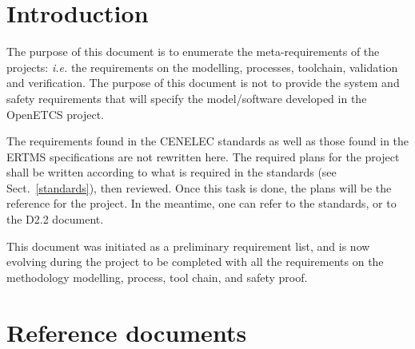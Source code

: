 \documentclass{template/openetcs_article}
\begin{document}
\newenvironment{comment}{
	\begin{quote}
	\begin{itshape}Comment. 
}{
	\end{itshape}
	\end{quote}
}

\newenvironment{justif}{
	\begin{quote}
	\begin{itshape}Justification. 
}{
	\end{itshape}
	\end{quote}
}


\def\reqt{R-WP2/D2.6}


\section{Introduction}
The purpose of this document is to enumerate the meta-requirements of the projects: \emph{i.e.} 
the requirements on the modelling, processes, toolchain, validation and verification. 
The purpose of this document is 
not to provide the system and safety requirements that will specify the model/software 
developed in the OpenETCS project.

The requirements found in the CENELEC standards as well as those found in the ERTMS specifications
are not rewritten here. The required plans for the 
project shall be written according to what is required in the standards (see Sect.~\ref{standards}),
then reviewed. Once this task is done, the plans will be the reference for the project.
In the meantime, one can refer to the standards, or to the D2.2 document.

This document was initiated as a preliminary requirement list, and is now evolving during the project 
to be completed with all the requirements on the methodology
modelling, process, tool chain, and safety proof.

\section{Reference documents}
\end{document}

